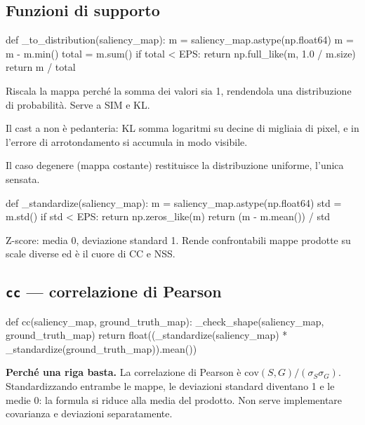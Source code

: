 \subsection{Funzioni di supporto}

\begin{idebox}
\begin{pycode}
def _to_distribution(saliency_map):
    m = saliency_map.astype(np.float64)
    m = m - m.min()
    total = m.sum()
    if total < EPS:
        return np.full_like(m, 1.0 / m.size)
    return m / total
\end{pycode}
\end{idebox}

Riscala la mappa perché la somma dei valori sia 1, rendendola una distribuzione di probabilità.
Serve a SIM e KL.

Il cast a  non è pedanteria: KL somma logaritmi su decine di migliaia di pixel, e
in  l'errore di arrotondamento si accumula in modo visibile.

Il caso degenere (mappa costante) restituisce la distribuzione uniforme, l'unica sensata.

\begin{idebox}
\begin{pycode}
def _standardize(saliency_map):
    m = saliency_map.astype(np.float64)
    std = m.std()
    if std < EPS:
        return np.zeros_like(m)
    return (m - m.mean()) / std
\end{pycode}
\end{idebox}

Z-score: media 0, deviazione standard 1. Rende confrontabili mappe prodotte su scale diverse ed è
il cuore di CC e NSS.

\subsection{\texttt{cc} --- correlazione di Pearson}

\begin{idebox}
\begin{pycode}
def cc(saliency_map, ground_truth_map):
    _check_shape(saliency_map, ground_truth_map)
    return float((_standardize(saliency_map) * _standardize(ground_truth_map)).mean())
\end{pycode}
\end{idebox}

\begin{nota}
\textbf{Perché una riga basta.} La correlazione di Pearson è
$\text{cov}(S,G) / (\sigma_S \sigma_G)$. Standardizzando entrambe le mappe, le deviazioni standard
diventano 1 e le medie 0: la formula si riduce alla media del prodotto. Non serve implementare
covarianza e deviazioni separatamente.
\end{nota}

